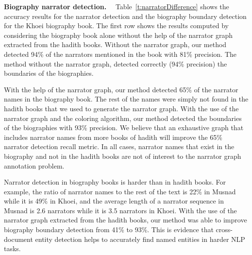\documentclass{llncs}
\begin{document}
{\bf Biography narrator detection.}~~
Table~\ref{t:narratorDifference} shows the accuracy results for the narrator detection and the biography boundary detection
for the Khoei biography book.
The first row shows the results computed by considering the biography book alone without the help of the narrator graph
extracted from the hadith books. 
Without the narrator graph, our method detected 94\% of the narrators mentioned in the book with 81\% precision. 
The method without the narrator graph, detected correctly (94\% precision) the boundaries of the biographies. 

With the help of the narrator graph, our method detected 65\% of the narrator names in the biography book. 
The rest of the names were simply not found in the hadith books that we used to generate the narrator graph. 
With the use of the narrator graph and the coloring algorithm, our method detected the boundaries of the biographies
with 93\% precision. 
We believe that an exhaustive graph that includes narrator names from more books of hadith will improve the 65\% narrator 
detection recall metric.
In all cases, narrator names that exist in the biography and not in the hadith books are not of interest to the narrator
graph annotation problem.

Narrator detection in biography books is harder than in hadith books. 
For example, the ratio of narrator names to the rest of the text is 22\% in Musnad while it is 49\% in Khoei,
and the average length of a narrator sequence in Musnad is 2.6 narrators while it is 3.5 narrators in Khoei.
With the use of the narrator graph extracted from the hadith books, our method was able to improve biography boundary detection
from 41\% to 93\%.
This is evidence that cross-document entity detection helps to accurately find named entities in harder NLP tasks. 
\end{document}
